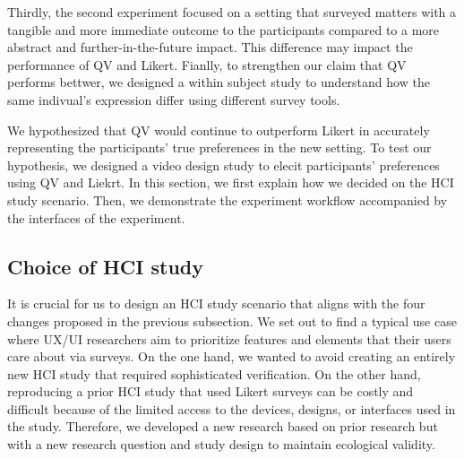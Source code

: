 Thirdly, the second experiment focused on a setting that surveyed matters with a tangible and more immediate outcome to the participants compared to a more abstract and further-in-the-future impact. This difference may impact the performance of QV and Likert. Fianlly, to strengthen our claim that QV performs bettwer, we designed a within subject study to understand how the same indivual's expression differ using different survey tools.

We hypothesized that QV would continue to outperform Likert in accurately representing the participants' true preferences in the new setting. To test our hypothesis, we designed a video design study to elecit participants' preferences using QV and Liekrt. In this section, we first explain how we decided on the HCI study scenario. Then, we demonstrate the experiment workflow accompanied by the interfaces of the experiment.

 
\subsection{Choice of HCI study}
It is crucial for us to design an HCI study scenario that aligns with the four changes proposed in the previous subsection. We set out to find a typical use case where UX/UI researchers aim to prioritize features and elements that their users care about via surveys. On the one hand, we wanted to avoid creating an entirely new HCI study that required sophisticated verification. On the other hand, reproducing a prior HCI study that used Likert surveys can be costly and difficult because of the limited access to the devices, designs, or interfaces used in the study. Therefore, we developed a new research based on prior research but with a new research question and study design to maintain ecological validity.

